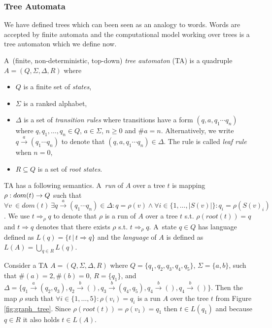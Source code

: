 \documentclass[a4paper, 12pt]{article}
\begin{document}
\subsubsection{Tree Automata}
\label{subsec:ta}

We have defined trees which can been seen as an analogy to words.
Words are accepted by finite automata and the computational model
working over trees is a tree automaton which we define now.

A~(finite, non-deterministic, top-down) \emph{tree automaton} (TA) is a
quadruple $A = (Q, \Sigma, \Delta, R)$ where
\begin{itemize}
	\item $Q$ is a finite set of \emph{states},
	\item $\Sigma$ is a ranked alphabet,
	\item $\Delta$ is a set of \emph{transition rules} where transitions have a form $(q,a,q_1 \cdots q_n)$ where $q,q_1,\ldots,q_n \in Q$, $a \in \Sigma$, $n \geq 0$ and $\#a = n$.
		Alternatively, we write $q \xrightarrow{a} (q_1 \cdots q_n)$ to denote that $(q,a,q_1 \cdots q_n) \in \Delta$.
		The rule is called \emph{leaf rule} when $n=0$,
	\item $R \subseteq Q$ is a set of \emph{root states}.
\end{itemize}

TA has a following semantics.
A~\emph{run} of $A$ over a tree $t$ is mapping $\rho: dom(t) \rightarrow Q$ such that
$\forall v~\in dom(t)\ \exists q \xrightarrow{a} (q_1 \cdots q_n) \in \Delta:  q=\rho(v) \wedge  \forall i \in \{1, \ldots, |S(v)|\}: q_i=\rho(S(v)_i)$.
We use $t \Rightarrow_{\rho} q$ to denote that $\rho$ is a run of $A$
over a tree $t$ s.t. $\rho(root(t)) = q$ and $t \Rightarrow q$ denotes that
there exists $\rho$ s.t. $t \Rightarrow_{\rho} q$. %
A~state $q\in Q$ has language defined as $L(q) = \{t\,|\, t \Rightarrow q\}$
and the \emph{language} of $A$ is defined as $L(A) = \bigcup_{q\in R} L(q)$.

\bexmp
Consider a TA $A=(Q,\Sigma,\Delta, R)$
where $Q=\{q_1,q_2,q_3,q_4,q_5\}$, $\Sigma = \{a,b\}$,
such that $\#(a) = 2, \#(b) =0$, $R=\{q_1\}$,
and $\Delta=\{q_1 \xrightarrow{a} (q_2,q_3), q_2 \xrightarrow{b} (),
q_3 \xrightarrow{b} (q_4,q_5), q_4 \xrightarrow{b} (), q_4 \xrightarrow{b} ()\}$.
Then the map $\rho$ such that $\forall i \in \{1,\ldots,5\}: \rho(v_i) = q_i$
is a run $A$ over the tree $t$ from Figure \ref{fig:graph_tree}.
Since $\rho(root(t)) = \rho(v_1) = q_1$ then $t \in L(q_1)$ and because $q \in R$
it also holds $t \in L(A)$.
\label{ex:ta}
\eexmp
\end{document}
